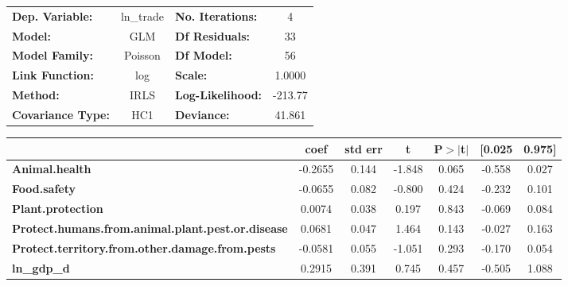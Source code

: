 \begin{center}
\begin{tabular}{lclc}
\toprule
\textbf{Dep. Variable:}                                   &   ln\_trade   & \textbf{  No. Iterations:    } &     4       \\
\textbf{Model:}                                           &      GLM      & \textbf{  Df Residuals:      } &     33      \\
\textbf{Model Family:}                                    &    Poisson    & \textbf{  Df Model:          } &     56      \\
\textbf{Link Function:}                                   &      log      & \textbf{  Scale:             } &    1.0000   \\
\textbf{Method:}                                          &      IRLS     & \textbf{  Log-Likelihood:    } &   -213.77   \\
\textbf{Covariance Type:}                                 &      HC1      & \textbf{  Deviance:          } &    41.861   \\
\bottomrule
\end{tabular}
\begin{tabular}{lcccccc}
                                                          & \textbf{coef} & \textbf{std err} & \textbf{t} & \textbf{P$> |$t$|$} & \textbf{[0.025} & \textbf{0.975]}  \\
\midrule
\textbf{Animal.health}                                    &      -0.2655  &        0.144     &    -1.848  &         0.065        &       -0.558    &        0.027     \\
\textbf{Food.safety}                                      &      -0.0655  &        0.082     &    -0.800  &         0.424        &       -0.232    &        0.101     \\
\textbf{Plant.protection}                                 &       0.0074  &        0.038     &     0.197  &         0.843        &       -0.069    &        0.084     \\
\textbf{Protect.humans.from.animal.plant.pest.or.disease} &       0.0681  &        0.047     &     1.464  &         0.143        &       -0.027    &        0.163     \\
\textbf{Protect.territory.from.other.damage.from.pests}   &      -0.0581  &        0.055     &    -1.051  &         0.293        &       -0.170    &        0.054     \\
\textbf{ln\_gdp\_d}                                       &       0.2915  &        0.391     &     0.745  &         0.457        &       -0.505    &        1.088     \\

\end{tabular}
\end{center}
